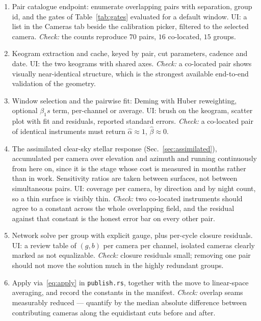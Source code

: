 \documentclass[11pt,a4paper]{article}
\newcommand{\gain}{g}
\newcommand{\off}{b}
\begin{document}
\begin{enumerate}\setcounter{enumi}{0}
  \item[\textbf{Stage 1.}] Pair catalogue endpoint: enumerate overlapping pairs
    with separation, group id, and the gates of Table~\ref{tab:gates} evaluated
    for a default window. UI: a list in the Cameras tab beside the calibration
    picker, filtered to the selected camera. \emph{Check:} the counts reproduce
    $70$ pairs, $16$ co-located, $15$ groups.
  \item[\textbf{Stage 2.}] Keogram extraction and cache, keyed by pair, cut
    parameters, cadence and date. UI: the two keograms with shared axes.
    \emph{Check:} a co-located pair shows visually near-identical structure,
    which is the strongest available end-to-end validation of the geometry.
  \item[\textbf{Stage 3.}] Window selection and the pairwise fit: Deming with
    Huber reweighting, optional $\beta_1 s$ term, per-channel or average. UI:
    brush on the keogram, scatter plot with fit and residuals, reported standard
    errors. \emph{Check:} a co-located pair of identical instruments must return
    $\hat\alpha\approx1$, $\hat\beta\approx0$.
  \item[\textbf{Stage 3b.}] The assimilated clear-sky stellar response
    (Sec.~\ref{sec:assimilated}), accumulated per camera over elevation and
    azimuth and running continuously from here on, since it is the stage whose
    cost is measured in months rather than in work. Sensitivity ratios are taken
    between surfaces, not between simultaneous pairs. UI: coverage per camera,
    by direction and by night count, so a thin surface is visibly thin.
    \emph{Check:} two co-located instruments should agree to a constant across
    the whole overlapping field, and the residual against that constant is the
    honest error bar on every other pair.
  \item[\textbf{Stage 4.}] Network solve per group with explicit gauge, plus
    per-cycle closure residuals. UI: a review table of $(\gain,\off)$ per camera
    per channel, isolated cameras clearly marked as not equalizable.
    \emph{Check:} closure residuals small; removing one pair should not move the
    solution much in the highly redundant groups.
  \item[\textbf{Stage 5.}] Apply via~\eqref{eq:apply} in \texttt{publish.rs},
    together with the move to linear-space averaging, and record the constants in
    the manifest. \emph{Check:} overlap seams measurably reduced --- quantify by
    the median absolute difference between contributing cameras along the
    equidistant cuts before and after.
\end{enumerate}
\end{document}
